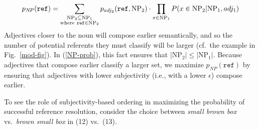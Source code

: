 \documentclass[preprint,authoryear]{elsarticle}\frenchspacing
\begin{document}
\begin{equation}
\label{NP-prob}
p_{N\!P}(\texttt{ref}) = \sum_{\substack{\textrm{NP}_2\subseteq\textrm{NP}_1\\ \textrm{where}\ \texttt{ref}\in\textrm{NP}_2}} p_{adj_2}(\texttt{ref}, \textrm{NP}_2) \cdot \prod_{x \in \textrm{NP}_1} P(x \in \textrm{NP}_2 | \textrm{NP}_1, adj_1)  \\
\end{equation}
%
%
%
Adjectives closer to the noun will compose earlier semantically, and so the number of potential referents they must classify will be larger (cf.~the example in Fig.~\ref{mod-fig}). In (\ref{NP-prob}), this fact ensures that $|\textrm{NP}_2| \leq |\textrm{NP}_1|$. 
Because adjectives that compose earlier classify a larger set, we maximize $p_{N\!P}(\texttt{ref})$ by ensuring that adjectives with lower subjectivity (i.e., with a lower $\epsilon$) compose earlier.

To see the role of subjectivity-based ordering in maximizing the probability of successful reference resolution, consider the choice between \emph{small brown box} vs.~\emph{brown small box} in (12) vs.~(13).\\ 
\end{document}
